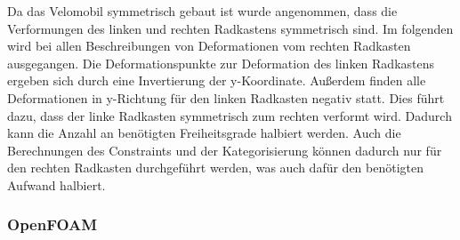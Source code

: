 Da das Velomobil symmetrisch gebaut ist wurde angenommen, dass die Verformungen des linken und rechten Radkastens symmetrisch sind.
Im folgenden wird bei allen Beschreibungen von Deformationen vom rechten Radkasten ausgegangen.
Die Deformationspunkte zur Deformation des linken Radkastens ergeben sich durch eine Invertierung der y-Koordinate.
Außerdem finden alle Deformationen in y-Richtung für den linken Radkasten negativ statt.
Dies führt dazu, dass der linke Radkasten symmetrisch zum rechten verformt wird.
Dadurch kann die Anzahl an benötigten Freiheitsgrade halbiert werden. 
Auch die Berechnungen des Constraints und der Kategorisierung können dadurch nur für den rechten Radkasten durchgeführt werden, was auch dafür den benötigten Aufwand halbiert.

\subsubsection{OpenFOAM}


